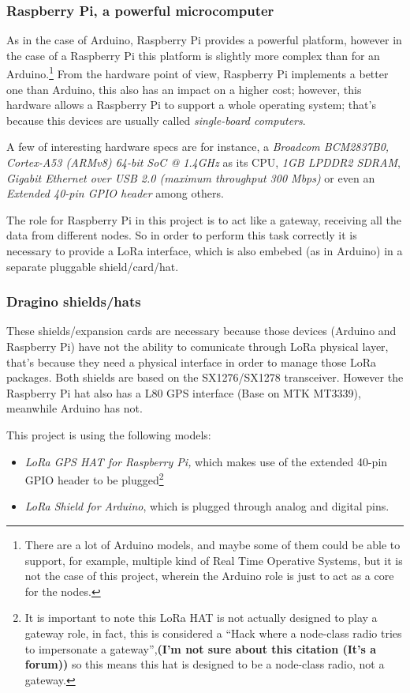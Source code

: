 \documentclass[11pt,a4paper,dvipsnames,twoside]{article}
\newcommand{\doubt}[1] {\textbf{\color{Red3}#1}}
\begin{document}
\subsubsection{Raspberry Pi, a powerful microcomputer}
As in the case of Arduino, Raspberry Pi provides a powerful platform, however in the case of a Raspberry Pi this platform is slightly more complex than for an Arduino.\footnote{There are a lot of Arduino models, and maybe some of them could be able to support, for example, multiple kind of Real Time Operative Systems, but it is not the case of this project, wherein the Arduino role is just to act as a core for the nodes.} From the hardware point of view, Raspberry Pi implements a better one than Arduino, this also has an impact on a higher cost; however, this hardware allows a Raspberry Pi to support a whole operating system; that's because this devices are usually called \textit{single-board computers}.

A few of interesting hardware specs are for instance, a \textit{Broadcom BCM2837B0, Cortex-A53 (ARMv8) 64-bit SoC @ 1.4GHz} as its CPU, \textit{1GB LPDDR2 SDRAM}, \textit{Gigabit Ethernet over USB 2.0 (maximum throughput 300 Mbps)} or even an \textit{Extended 40-pin GPIO header} among others.\cite{RPiSpecs}

The role for Raspberry Pi in this project is to act like a gateway, receiving all the data from different nodes. So in order to perform this task correctly it is necessary to provide a LoRa interface, which is also embebed (as in Arduino) in a separate pluggable shield/card/hat.

\subsubsection{Dragino shields/hats}\label{sssec:DraginoShields}
These shields/expansion cards are necessary because those devices (Arduino and Raspberry Pi) have not the ability to comunicate through LoRa physical layer, that's because they need a physical interface in order to manage those LoRa packages. Both shields are based on the SX1276/SX1278 transceiver. However the Raspberry Pi hat also has a L80 GPS interface (Base on MTK MT3339), meanwhile Arduino has not.

This project is using the following models: 

\begin{itemize}
  \item \textit{LoRa GPS HAT for Raspberry Pi,}\cite{DraginoRpiHat} which makes use of the extended 40-pin GPIO header to be plugged\footnote{It is important to note this LoRa HAT is not actually designed to play a gateway role, in fact, this is considered a \enquote{Hack where a node-class radio tries to impersonate a gateway}\cite{RpiHatHack},\doubt{(I'm not sure about this citation (It's a forum))} so this means this hat is designed to be a node-class radio, not a gateway.}
  \item \textit{LoRa Shield for Arduino}\cite{DraginoArdShield}, which is plugged through analog and digital pins.
\end{itemize}
\end{document}
